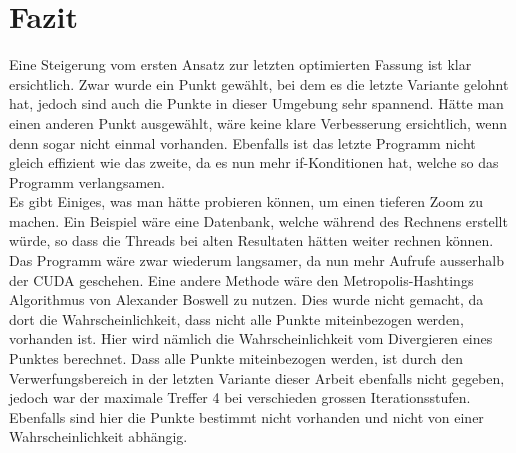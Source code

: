 \section{Fazit}
Eine Steigerung vom ersten Ansatz zur letzten optimierten Fassung ist klar ersichtlich. Zwar wurde ein Punkt gewählt, bei dem es die letzte Variante gelohnt hat, jedoch sind auch die Punkte in dieser Umgebung sehr spannend. Hätte man einen anderen Punkt ausgewählt, wäre keine klare Verbesserung ersichtlich, wenn denn sogar nicht einmal vorhanden. Ebenfalls ist das letzte Programm nicht gleich effizient wie das zweite, da es nun mehr if-Konditionen hat, welche so das Programm verlangsamen.\\
Es gibt Einiges, was man hätte probieren können, um einen tieferen Zoom zu machen. Ein Beispiel wäre eine Datenbank, welche während des Rechnens erstellt würde, so dass die Threads bei alten Resultaten hätten weiter rechnen können. Das Programm wäre zwar wiederum langsamer, da nun mehr Aufrufe ausserhalb der CUDA geschehen. Eine andere Methode wäre den Metropolis-Hashtings Algorithmus von Alexander Boswell zu nutzen. Dies wurde nicht gemacht, da dort die Wahrscheinlichkeit, dass nicht alle Punkte miteinbezogen werden, vorhanden ist. Hier wird nämlich die Wahrscheinlichkeit vom Divergieren eines Punktes berechnet. Dass alle Punkte miteinbezogen werden, ist durch den Verwerfungsbereich in der letzten Variante dieser Arbeit ebenfalls nicht gegeben, jedoch war der maximale Treffer 4 bei verschieden grossen Iterationsstufen. Ebenfalls sind hier die Punkte bestimmt nicht vorhanden und nicht von einer Wahrscheinlichkeit abhängig.